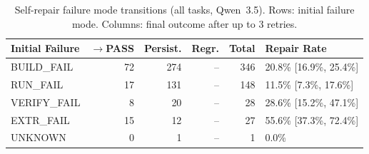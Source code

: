 \begin{table}[htbp]
\centering
\caption{Self-repair failure mode transitions (all tasks, Qwen~3.5). Rows: initial failure mode. Columns: final outcome after up to 3 retries.}
\label{tab:repair-transitions}
\small
\begin{tabular}{@{}lrrrrl@{}}
\toprule
Initial Failure & $\to$PASS & Persist. & Regr. & Total & Repair Rate \\
\midrule
BUILD\_FAIL & 72 & 274 & -- & 346 & 20.8\% [16.9\%, 25.4\%] \\ %
RUN\_FAIL & 17 & 131 & -- & 148 & 11.5\% [7.3\%, 17.6\%] \\ %
VERIFY\_FAIL & 8 & 20 & -- & 28 & 28.6\% [15.2\%, 47.1\%] \\ %
EXTR\_FAIL & 15 & 12 & -- & 27 & 55.6\% [37.3\%, 72.4\%] \\ %
UNKNOWN & 0 & 1 & -- & 1 & 0.0\% \\ %
\bottomrule
\end{tabular}
\end{table}



